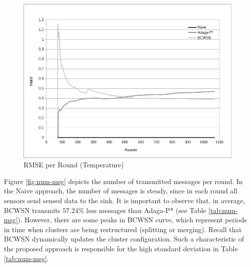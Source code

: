 \documentclass{acm_proc_article-sp}
\begin{document}
\begin{figure}[!htb]
\begin{center}
	\includegraphics[scale=0.45]{BCWSN-RMSExRound-PB.png}
	 \vspace*{-.5cm}
    \caption{RMSE per Round (Temperature)}
    \label{fig:rmse}
\end{center}
\end{figure}

Figure \ref{fig:num-msg} depicts the number of transmitted messages
per round. In the Naive approach, the number of messages is steady, since in
each round all sensors send sensed data to the sink. It is important to observe
that, in average, BCWSN transmits $57.24\%$ less messages than Adaga-P* (see Table
\ref{tab:num-msg}). However, there are some peaks in BCWSN curve, which
represent periods in time when clusters are being restructured (splitting or
merging). Recall that BCWSN dynamically updates the cluster configuration. Such a characteristic of the proposed approach is responsible for the high standard deviation in Table \ref{tab:num-msg}.
\end{document}
